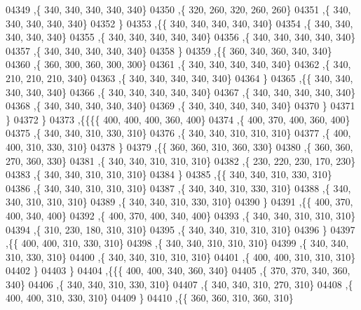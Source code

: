 \begin{DoxyCode}
04349     ,\{   340,   340,   340,   340,   340\}
04350     ,\{   320,   260,   320,   260,   260\}
04351     ,\{   340,   340,   340,   340,   340\}
04352     \}
04353    ,\{\{   340,   340,   340,   340,   340\}
04354     ,\{   340,   340,   340,   340,   340\}
04355     ,\{   340,   340,   340,   340,   340\}
04356     ,\{   340,   340,   340,   340,   340\}
04357     ,\{   340,   340,   340,   340,   340\}
04358     \}
04359    ,\{\{   360,   340,   360,   340,   340\}
04360     ,\{   360,   300,   360,   300,   300\}
04361     ,\{   340,   340,   340,   340,   340\}
04362     ,\{   340,   210,   210,   210,   340\}
04363     ,\{   340,   340,   340,   340,   340\}
04364     \}
04365    ,\{\{   340,   340,   340,   340,   340\}
04366     ,\{   340,   340,   340,   340,   340\}
04367     ,\{   340,   340,   340,   340,   340\}
04368     ,\{   340,   340,   340,   340,   340\}
04369     ,\{   340,   340,   340,   340,   340\}
04370     \}
04371    \}
04372   \}
04373  ,\{\{\{\{   400,   400,   400,   360,   400\}
04374     ,\{   400,   370,   400,   360,   400\}
04375     ,\{   340,   340,   310,   330,   310\}
04376     ,\{   340,   340,   310,   310,   310\}
04377     ,\{   400,   400,   310,   330,   310\}
04378     \}
04379    ,\{\{   360,   360,   310,   360,   330\}
04380     ,\{   360,   360,   270,   360,   330\}
04381     ,\{   340,   340,   310,   310,   310\}
04382     ,\{   230,   220,   230,   170,   230\}
04383     ,\{   340,   340,   310,   310,   310\}
04384     \}
04385    ,\{\{   340,   340,   310,   330,   310\}
04386     ,\{   340,   340,   310,   310,   310\}
04387     ,\{   340,   340,   310,   330,   310\}
04388     ,\{   340,   340,   310,   310,   310\}
04389     ,\{   340,   340,   310,   330,   310\}
04390     \}
04391    ,\{\{   400,   370,   400,   340,   400\}
04392     ,\{   400,   370,   400,   340,   400\}
04393     ,\{   340,   340,   310,   310,   310\}
04394     ,\{   310,   230,   180,   310,   310\}
04395     ,\{   340,   340,   310,   310,   310\}
04396     \}
04397    ,\{\{   400,   400,   310,   330,   310\}
04398     ,\{   340,   340,   310,   310,   310\}
04399     ,\{   340,   340,   310,   330,   310\}
04400     ,\{   340,   340,   310,   310,   310\}
04401     ,\{   400,   400,   310,   310,   310\}
04402     \}
04403    \}
04404   ,\{\{\{   400,   400,   340,   360,   340\}
04405     ,\{   370,   370,   340,   360,   340\}
04406     ,\{   340,   340,   310,   330,   310\}
04407     ,\{   340,   340,   310,   270,   310\}
04408     ,\{   400,   400,   310,   330,   310\}
04409     \}
04410    ,\{\{   360,   360,   310,   360,   310\}

\end{DoxyCode}
